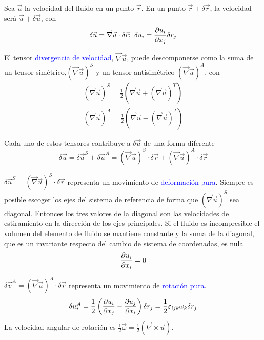 	
	Sea $\vec{u}$ la velocidad del fluido en un punto $\vec{r}$. En
	un punto $\vec{r}+\delta\vec{r}$, la velocidad será $\vec{u}+\delta\vec{u}$,
	con 
	\[
	\delta\vec{u}=\vec{\nabla}\vec{u}\cdot\delta\vec{r};\ \delta u_{i}=\dparc{u_{i}}{x_{j}}\delta r_{j}
	\]
	
	El tensor \textcolor{blue}{divergencia de velocidad}, $\vec{\nabla}\vec{u}$,
	puede descomponerse como la suma de un tensor simétrico,$\left(\vec{\nabla}\vec{u}\right)^{S}$
	y un tensor antisimétrico $\left(\vec{\nabla}\vec{u}\right)^{A}$,
	con 
	\begin{eqnarray*}
		\left(\vec{\nabla}\vec{u}\right)^{S}=\frac{1}{2}\left(\vec{\nabla}\vec{u}+\left(\vec{\nabla}\vec{u}\right)^{T}\right)\\
		\left(\vec{\nabla}\vec{u}\right)^{A}=\frac{1}{2}\left(\vec{\nabla}\vec{u}-\left(\vec{\nabla}\vec{u}\right)^{T}\right)
	\end{eqnarray*}
	
	Cada uno de estos tensores contribuye a $\delta\vec{u}$ de una forma
	diferente 
	\[
	\delta\vec{u}=\delta\vec{u}^{S}+\delta\vec{u}^{A}=\left(\vec{\nabla}\vec{u}\right)^{S}\cdot\delta\vec{r}+\left(\vec{\nabla}\vec{u}\right)^{A}\cdot\delta\vec{r}
	\]
	

	
	$\delta\vec{u}^{S}=\left(\vec{\nabla}\vec{u}\right)^{S}\cdot\delta\vec{r}$
	representa un movimiento de \textcolor{blue}{deformación pura}. Siempre
	es posible escoger los ejes del sistema de referencia de forma que
	$\left(\vec{\nabla}\vec{u}\right)^{S}$ sea diagonal. Entonces los
	tres valores de la diagonal son las velocidades de estiramiento en
	la dirección de los ejes principales. Si el fluido es incompresible
	el volumen del elemento de fluido se mantiene constante y la suma
	de la diagonal, que es un invariante respecto del cambio de sistema
	de coordenadas, es nula 
	\[
	\frac{\partial u_{i}}{\partial x_{i}}=0
	\]
	

	
	$\delta\vec{v}^{A}=\left(\vec{\nabla}\vec{u}\right)^{A}\cdot\delta\vec{r}$
	representa un movimiento de \textcolor{blue}{rotación pura}. 
	\[
	\delta u_{i}^{A}=\frac{1}{2}\left(\frac{\partial u_{i}}{\partial x_{j}}-\frac{\partial u_{j}}{\partial x_{i}}\right)\delta r_{j}=\frac{1}{2}\varepsilon_{ijk}\omega_{k}\delta r_{j}
	\]
	La velocidad angular de rotación es $\frac{1}{2}\vec{\omega}=\frac{1}{2}(\vec{\nabla}\times\vec{u})$. 

